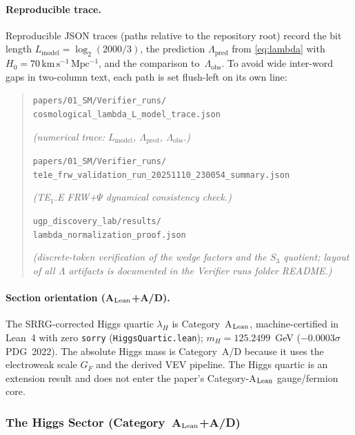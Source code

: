 \documentclass[11pt]{article}
\theoremstyle{remark}
\begin{document}
\paragraph{Reproducible trace.}
\label{subsec:cosmo_lambda_artifact}
{\RaggedRight\sloppy\small
\noindent
Reproducible JSON traces (paths relative to the repository root) record the bit length $L_{\mathrm{model}}=\log_2(2000/3)$, the prediction $\Lambda_{\mathrm{pred}}$ from \cref{eq:lambda} with $H_0 = 70\,\mathrm{km\,s^{-1}\,Mpc^{-1}}$, and the comparison to~$\Lambda_{\mathrm{obs}}$.
To avoid wide inter-word gaps in two-column text, each path is set flush-left on its own line:
\par\smallskip
}
\begin{quote}
\scriptsize\raggedright\sloppy
\noindent\texttt{papers/01\_SM/Verifier\_runs/}\\
\texttt{cosmological\_lambda\_L\_model\_trace.json}\par
{\itshape\small (numerical trace: $L_{\mathrm{model}}$, $\Lambda_{\mathrm{pred}}$, $\Lambda_{\mathrm{obs}}$.)}\par\medskip
\noindent\texttt{papers/01\_SM/Verifier\_runs/}\\
\texttt{te1e\_frw\_validation\_run\_20251110\_230054\_summary.json}\par
{\itshape\small (TE$_1$.E FRW+$\Psi$ dynamical consistency check.)}\par\medskip
\noindent\texttt{ugp\_discovery\_lab/results/}\\
\texttt{lambda\_normalization\_proof.json}\par
{\itshape\small (discrete-token verification of the wedge factors and the $S_3$ quotient; layout of all $\Lambda$ artifacts is documented in the Verifier runs folder README.)}
\end{quote}
\justifying
\paragraph{Section orientation (A$_{\rm Lean}$+A/D).}
The SRRG-corrected Higgs quartic $\lambda_H$ is Category~A$_{\rm Lean}$, machine-certified in Lean~4 with zero \texttt{sorry} (\texttt{HiggsQuartic.lean}); $m_H = 125.2499$~GeV ($-0.0003\sigma$ PDG~2022).
The absolute Higgs mass is Category~A/D because it uses the electroweak scale $G_F$ and the derived VEV pipeline.
The Higgs quartic is an extension result and does not enter the paper's Category-A$_{\rm Lean}$ gauge/fermion core.

\subsubsection{The Higgs Sector (Category~A$_{\rm Lean}$+A/D)}
\label{subsec:higgs}
\end{document}
